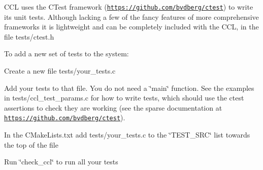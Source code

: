C\+CL uses the C\+Test framework (\href{https://github.com/bvdberg/ctest}{\tt https\+://github.\+com/bvdberg/ctest}) to write its unit tests. Although lacking a few of the fancy features of more comprehensive frameworks it is lightweight and can be completely included with the C\+CL, in the file tests/ctest.\+h

To add a new set of tests to the system\+:


\begin{DoxyItemize}
\item Create a new file tests/your\+\_\+tests.\+c
\item Add your tests to that file. You do not need a \char`\"{}main\char`\"{} function. See the examples in tests/ccl\+\_\+test\+\_\+params.\+c for how to write tests, which should use the ctest assertions to check they are working (see the sparse documentation at \href{https://github.com/bvdberg/ctest}{\tt https\+://github.\+com/bvdberg/ctest}).
\item In the C\+Make\+Lists.\+txt add tests/your\+\_\+tests.\+c to the \char`\"{}\+T\+E\+S\+T\+\_\+\+S\+R\+C\char`\"{} list towards the top of the file
\item Run \char`\"{}check\+\_\+ccl\char`\"{} to run all your tests 
\end{DoxyItemize}